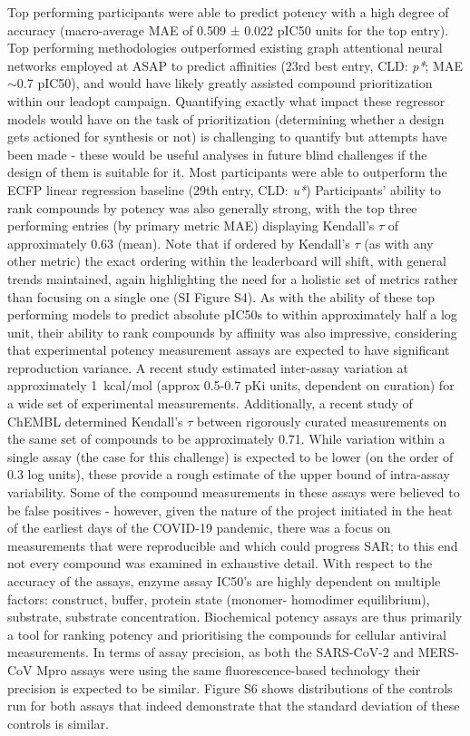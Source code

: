\documentclass[journal=jcim,manuscript=article]{achemso}
\begin{document}
Top performing participants were able to predict potency with a high degree of accuracy (macro-average MAE of 0.509 ± 0.022 pIC50 units for the top entry). Top performing methodologies outperformed existing graph attentional neural networks employed at ASAP to predict affinities (23rd best entry, CLD: \textit{p*}; MAE$\sim$0.7 pIC50), and would have likely greatly assisted compound prioritization within our leadopt campaign. Quantifying exactly what impact these regressor models would have on the task of prioritization (determining whether a design gets actioned for synthesis or not) is challenging to quantify but attempts have been made - these would be useful analyses in future blind challenges if the design of them is suitable for it.\cite{ash_practically_2024} Most participants were able to outperform the ECFP linear regression baseline (29th entry, CLD: \textit{u*}) Participants' ability to rank compounds by potency was also generally strong, with the top three performing entries (by primary metric MAE) displaying Kendall's $\tau$ of approximately 0.63 (mean). Note that if ordered by Kendall's $\tau$ (as with any other metric) the exact ordering within the leaderboard will shift, with general trends maintained, again highlighting the need for a holistic set of metrics rather than focusing on a single one (SI Figure S4). As with the ability of these top performing models to predict absolute pIC50s to within approximately half a log unit, their ability to rank compounds by affinity was also impressive, considering that experimental potency measurement assays are expected to have significant reproduction variance. A recent study estimated inter-assay variation at approximately 1~kcal/mol (approx 0.5-0.7 pKi units, dependent on curation)\cite{ross_maximal_2023} for a wide set of experimental measurements. Additionally, a recent study of ChEMBL\cite{landrum_combining_2024} determined Kendall's $\tau$ between rigorously curated measurements on the same set of compounds to be approximately 0.71. While variation within a single assay (the case for this challenge) is expected to be lower (on the order of 0.3 log units\cite{ross_maximal_2023}), these provide a rough estimate of the upper bound of intra-assay variability. Some of the compound measurements in these assays were believed to be false positives - however, given the nature of the project initiated in the heat of the earliest days of the COVID-19 pandemic, there was a focus on measurements that were reproducible and which could progress SAR; to this end not every compound was examined in exhaustive detail. With respect to the accuracy of the assays, enzyme assay IC50's are highly dependent on multiple factors: construct, buffer, protein state (monomer- homodimer equilibrium), substrate, substrate concentration. Biochemical potency assays are thus primarily a tool for ranking potency and prioritising the compounds for cellular antiviral measurements. In terms of assay precision, as both the SARS-CoV-2 and MERS-CoV Mpro assays were using the same fluorescence-based technology their precision is expected to be similar. Figure S6 shows distributions of the controls run for both assays that indeed demonstrate that the standard deviation of these controls is similar.
\end{document}
